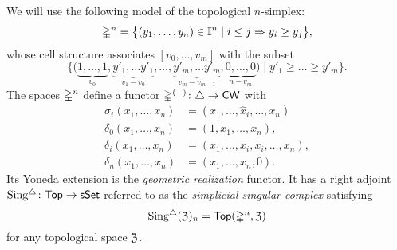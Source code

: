 We will use the following model of the topological $n$-simplex:
\[
\mathbb{\Delta}^n = \big\{ (y_1, \dots, y_n) \in \mathbb{I}^n \mid i \leq j \Rightarrow y_i \geq y_j \big\},
\]
whose cell structure associates $[v_0, \dots, v_m]$ with the subset
\begin{equation} \label{e:cell structure of gsimplex}
	\Big\{ \big( \underbrace{1, \dots, 1}_{v_0}, \underbrace{y'_1, \dots y'_1}_{v_1-v_0}, \dots, \underbrace{y'_m, \dots y'_m}_{v_m-v_{m-1}}, \underbrace{0, \dots, 0}_{n-v_m} \big) \mid y'_1 \geq \dots \geq y'_m \Big\}.
\end{equation}
The spaces $\mathbb{\Delta}^n$ define a functor $\mathbb{\Delta}^{(-)} \colon \triangle \to \mathsf{CW} $ with
\begin{align*}
	\sigma_i(x_1, \dots, x_n) &= (x_1, \dots, \widehat x_i, \dots, x_n) \\
	\delta_0(x_1, \dots, x_n) &= (1, x_1, \dots, x_n), \\
	\delta_i(x_1, \dots, x_n) &= (x_1, \dots, x_i, x_i, \dots, x_n), \\
	\delta_n(x_1, \dots, x_n) &= (x_1, \dots, x_n, 0).
\end{align*}
Its Yoneda extension is the \textit{geometric realization} functor.
It has a right adjoint $\operatorname{Sing^{\triangle}} \colon \mathsf{Top} \to \mathsf{sSet}$ referred to as the \textit{simplicial singular complex} satisfying
\[
\operatorname{Sing^{\triangle}}(\mathfrak{Z})_n = \mathsf{Top}(\mathbb{\Delta}^n, \mathfrak{Z})
\]
for any topological space $\mathfrak{Z}$.


